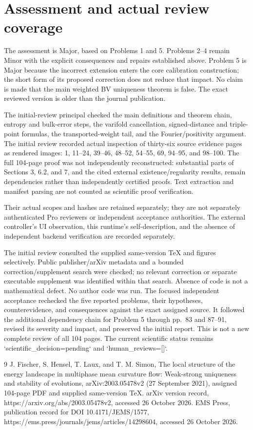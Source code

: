 \documentclass[10pt]{article}
\begin{document}
\section*{Assessment and actual review coverage}
The assessment is Major, based on Problems 1 and 5. Problems 2–4 remain Minor with the explicit consequences and repairs established above. Problem 5 is Major because the incorrect extension enters the core calibration construction; the short form of its proposed correction does not reduce that impact. No claim is made that the main weighted BV uniqueness theorem is false. The exact reviewed version is older than the journal publication.\par
The initial-review principal checked the main definitions and theorem chain, entropy and bulk-error steps, the varifold cancellation, signed-distance and triple-point formulas, the transported-weight tail, and the Fourier/positivity argument. The initial review recorded actual inspection of thirty-six source evidence pages as rendered images: 1, 11–24, 39–46, 48–52, 54–55, 69, 94–95, and 98–100. The full 104-page proof was not independently reconstructed: substantial parts of Sections 3, 6.2, and 7, and the cited external existence/regularity results, remain dependencies rather than independently certified proofs. Text extraction and manifest parsing are not counted as scientific proof verification.\par
Their actual scopes and hashes are retained separately; they are not separately authenticated Pro reviewers or independent acceptance authorities. The external controller’s UI observation, this runtime’s self-description, and the absence of independent backend verification are recorded separately.\par
The initial review consulted the supplied same-version TeX and figures selectively. Public publisher/arXiv metadata and a bounded correction/supplement search were checked; no relevant correction or separate executable supplement was identified within that search. Absence of code is not a mathematical defect. No author code was run. The focused independent acceptance rechecked the five reported problems, their hypotheses, counterevidence, and consequences against the exact assigned source. It followed the additional dependency chain for Problem 5 through pp. 83 and 87–91, revised its severity and impact, and preserved the initial report. This is not a new complete review of all 104 pages. The current scientific status remains `scientific\_decision=pending` and `human\_reviews=[]`.\par
9 J. Fischer, S. Hensel, T. Laux, and T. M. Simon, The local structure of the energy landscape in multiphase mean curvature flow: Weak-strong uniqueness and stability of evolutions, arXiv:2003.05478v2 (27 September 2021), assigned 104-page PDF and supplied same-version TeX. arXiv version record, https://arxiv.org/abs/2003.05478v2, accessed 26 October 2026. EMS Press, publication record for DOI 10.4171/JEMS/1577, https://ems.press/journals/jems/articles/14298604, accessed 26 October 2026.\par
\end{document}
